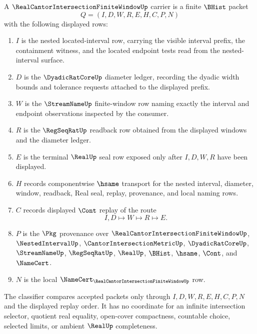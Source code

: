 \begin{definition}
\label{def:real-cantor-intersection-finite-window-carrier}
A $\RealCantorIntersectionFiniteWindowUp$ carrier is a finite $\BHist$ packet
$$
Q=(I,D,W,R,E,H,C,P,N)
$$
with the following displayed rows:
\begin{enumerate}
\item $I$ is the nested located-interval row, carrying the visible interval prefix, the containment witness, and the located endpoint tests read from the nested-interval surface.
\item $D$ is the $\DyadicRatCoreUp$ diameter ledger, recording the dyadic width bounds and tolerance requests attached to the displayed prefix.
\item $W$ is the $\StreamNameUp$ finite-window row naming exactly the interval and endpoint observations inspected by the consumer.
\item $R$ is the $\RegSeqRatUp$ readback row obtained from the displayed windows and the diameter ledger.
\item $E$ is the terminal $\RealUp$ seal row exposed only after $I,D,W,R$ have been displayed.
\item $H$ records componentwise $\hsame$ transport for the nested interval, diameter, window, readback, Real seal, replay, provenance, and local naming rows.
\item $C$ records displayed $\Cont$ replay of the route
$$
I,D \longmapsto W \longmapsto R \longmapsto E .
$$
\item $P$ is the $\Pkg$ provenance over $\RealCantorIntersectionFiniteWindowUp$, $\NestedIntervalUp$, $\CantorIntersectionMetricUp$, $\DyadicRatCoreUp$, $\StreamNameUp$, $\RegSeqRatUp$, $\RealUp$, $\BHist$, $\hsame$, $\Cont$, and $\NameCert$.
\item $N$ is the local $\NameCert_{\RealCantorIntersectionFiniteWindowUp}$ row.
\end{enumerate}
The classifier compares accepted packets only through $I,D,W,R,E,H,C,P,N$ and the displayed replay order. It has no coordinate for an infinite intersection selector, quotient real equality, open-cover compactness, countable choice, selected limits, or ambient $\RealUp$ completeness.
\end{definition}

